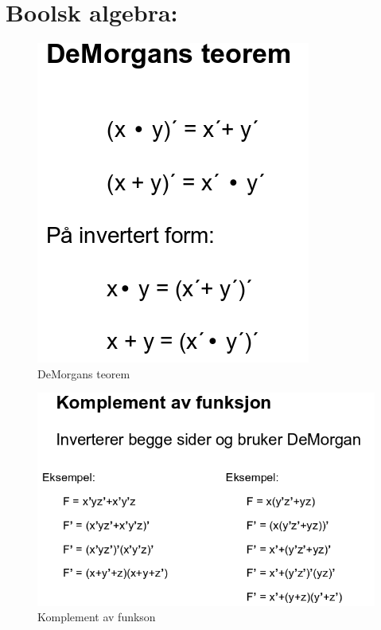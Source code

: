 \documentclass{article}
\begin{document}
	
	\section{Boolsk algebra:}
	
	\begin{figure}[H]
		\includegraphics[scale=0.4]{DeMorgan.png}
		\caption{DeMorgans teorem}
	\end{figure}
	
	\begin{figure}[H]
		\includegraphics[scale=0.55]{Komplement.png}
		\caption{Komplement av funkson}
	\end{figure}
	
\end{document}
